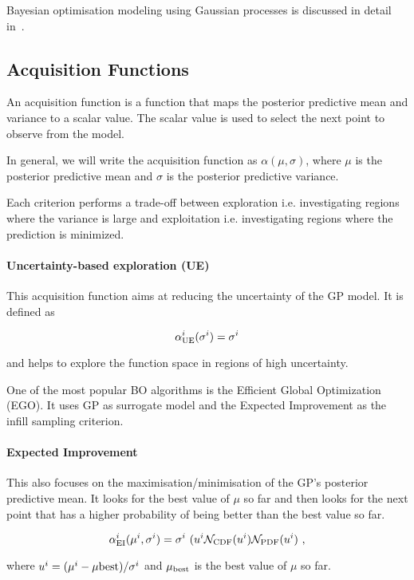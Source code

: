 \documentclass[twocolumn]{aastex631}
\begin{document}
Bayesian optimisation modeling using Gaussian processes is discussed in detail in~\cite{}.



\subsection{Acquisition Functions}

An acquisition function is a function that maps the posterior predictive mean and variance to a scalar value. The scalar value is used to select the next point to observe from the model.

In general, we will write the acquisition function as $\alpha(\mu,\sigma)$, where $\mu$ is the posterior predictive mean and $\sigma$ is the posterior predictive variance.

Each criterion performs a trade-off between exploration i.e. investigating regions where the variance is large and exploitation i.e. investigating regions where the prediction is minimized. 

\paragraph{Uncertainty-based exploration (UE)}

This acquisition function aims at reducing the uncertainty of the GP model. It is defined as

$$
\alpha_{\rm{UE}}^i(\sigma^i)= \sigma^i
$$

and helps to explore the function space in regions of high uncertainty.

One of the most popular BO algorithms is the Efficient Global Optimization (EGO). 
It uses GP as surrogate model and the Expected Improvement as the infill sampling criterion. 


\paragraph{Expected Improvement}

This also focuses on the maximisation/minimisation of the GP's posterior predictive mean.
It looks for the best value of $\mu$ so far and then looks for the next point that has a higher probability of being better than the best value so far.

$$
\alpha_{\rm{EI}}^i(\mu^i, \sigma^i)= \sigma^i\ (u^i \mathcal{N}_{\rm CDF}(u^i) \mathcal{N}_{\rm PDF}(u^i)\ ,
$$

where $u^i = {(\mu^i - \mu{\rm{best})}}/{\sigma^i}$ and $\mu_{\rm{best}}$ is the best value of $\mu$ so far.
\end{document}

